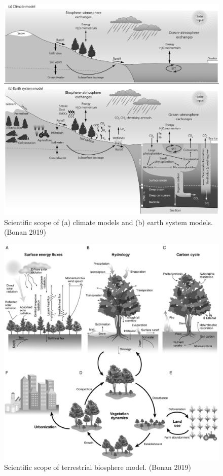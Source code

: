 \documentclass[
  oneside]{book}
\begin{document}
\begin{figure}

{\centering \includegraphics[width=0.8\linewidth]{figures/chap1/GCM_ESM} 

}

\caption{Scientific scope of (a) climate models and (b) earth system models. (Bonan 2019)}\label{fig:f3}
\end{figure}

\begin{figure}

{\centering \includegraphics[width=0.8\linewidth]{figures/chap1/cycles_bonan} 

}

\caption{Scientific scope of terrestrial biosphere model. (Bonan 2019)}\label{fig:f4}
\end{figure}
\end{document}
